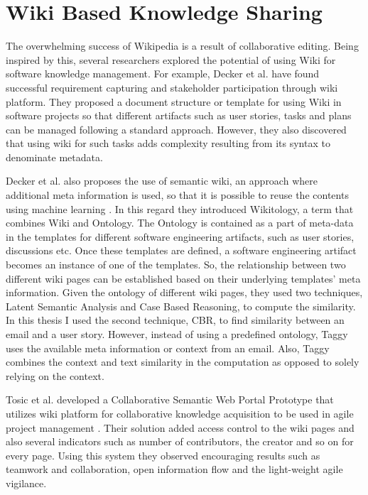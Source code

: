\section{Wiki Based Knowledge Sharing}
The overwhelming success of Wikipedia \cite{wikipedia} is a result of collaborative editing. Being inspired by this, several researchers explored the potential of using Wiki for software knowledge management. For example, Decker et al. have found successful requirement capturing and stakeholder participation through wiki platform\cite{wiki_based}. They proposed a document structure or template for using Wiki in software projects so that different artifacts such as user stories, tasks and plans can be managed following a standard approach. However, they also discovered that using wiki for such tasks adds complexity resulting from its syntax to denominate metadata.

Decker et al. also proposes the use of semantic wiki, an approach where additional meta information is used, so that it is possible to reuse the contents using machine learning \cite{self_organized}. In this regard they introduced Wikitology, a term that combines Wiki and Ontology. The Ontology is contained as a part of meta-data in the templates for different software engineering artifacts, such as user stories, discussions etc. Once these templates are defined, a software engineering artifact becomes an instance of one of the templates. So, the relationship between two different wiki pages can be established based on their underlying templates' meta information. Given the ontology of different wiki pages, they used two techniques, Latent Semantic Analysis and Case Based Reasoning, to compute the similarity. In this thesis I used the second technique, CBR, to find similarity between an email and a user story. However, instead of using a predefined ontology, Taggy uses the available meta information or context from an email. Also, Taggy combines the context and text similarity in the computation as opposed to solely relying on the context.

Tosic et al. developed a Collaborative Semantic Web Portal Prototype that utilizes wiki platform for collaborative knowledge acquisition to be used in agile project management \cite{collaborative_knowledge}. Their solution added access control to the wiki pages and also several indicators such as number of contributors, the creator and so on for every page. Using this system they observed encouraging results such as teamwork and collaboration, open information flow and the light-weight agile vigilance. 

